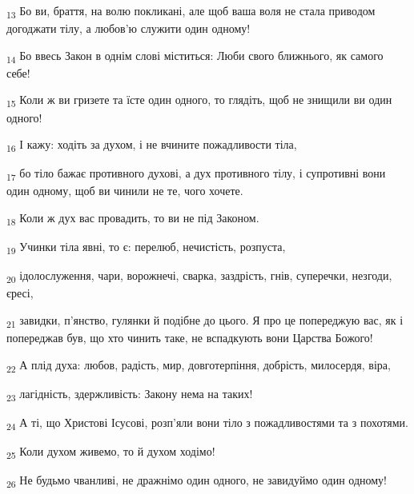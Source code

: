 \begin{tcolorbox}
\textsubscript{13} Бо ви, браття, на волю покликані, але щоб ваша воля не стала приводом догоджати тілу, а любов'ю служити один одному!
\end{tcolorbox}
\begin{tcolorbox}
\textsubscript{14} Бо ввесь Закон в однім слові міститься: Люби свого ближнього, як самого себе!
\end{tcolorbox}
\begin{tcolorbox}
\textsubscript{15} Коли ж ви гризете та їсте один одного, то глядіть, щоб не знищили ви один одного!
\end{tcolorbox}
\begin{tcolorbox}
\textsubscript{16} І кажу: ходіть за духом, і не вчините пожадливости тіла,
\end{tcolorbox}
\begin{tcolorbox}
\textsubscript{17} бо тіло бажає противного духові, а дух противного тілу, і супротивні вони один одному, щоб ви чинили не те, чого хочете.
\end{tcolorbox}
\begin{tcolorbox}
\textsubscript{18} Коли ж дух вас провадить, то ви не під Законом.
\end{tcolorbox}
\begin{tcolorbox}
\textsubscript{19} Учинки тіла явні, то є: перелюб, нечистість, розпуста,
\end{tcolorbox}
\begin{tcolorbox}
\textsubscript{20} ідолослуження, чари, ворожнечі, сварка, заздрість, гнів, суперечки, незгоди, єресі,
\end{tcolorbox}
\begin{tcolorbox}
\textsubscript{21} завидки, п'янство, гулянки й подібне до цього. Я про це попереджую вас, як і попереджав був, що хто чинить таке, не вспадкують вони Царства Божого!
\end{tcolorbox}
\begin{tcolorbox}
\textsubscript{22} А плід духа: любов, радість, мир, довготерпіння, добрість, милосердя, віра,
\end{tcolorbox}
\begin{tcolorbox}
\textsubscript{23} лагідність, здержливість: Закону нема на таких!
\end{tcolorbox}
\begin{tcolorbox}
\textsubscript{24} А ті, що Христові Ісусові, розп'яли вони тіло з пожадливостями та з похотями.
\end{tcolorbox}
\begin{tcolorbox}
\textsubscript{25} Коли духом живемо, то й духом ходімо!
\end{tcolorbox}
\begin{tcolorbox}
\textsubscript{26} Не будьмо чванливі, не дражнімо один одного, не завидуймо один одному!
\end{tcolorbox}
